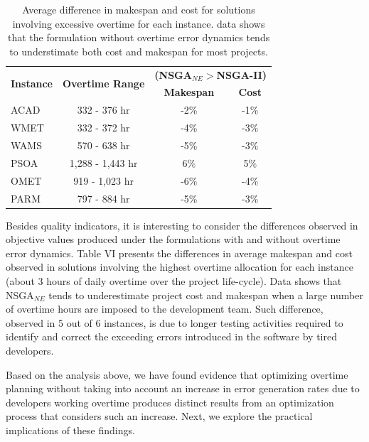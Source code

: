 \documentclass[conference]{IEEEtran}
\begin{document}
\begin{table}[htbp]
	\scriptsize
  \centering
  \caption{Average difference in makespan and cost for solutions involving excessive overtime for each instance. data shows that the formulation without overtime error dynamics tends to understimate both cost and makespan for most projects.}
    \begin{tabular}{rccc}
    \toprule
    \multicolumn{1}{c}{\multirow{2}[2]{*}{\textbf{Instance}}} & \multirow{2}[2]{*}{\textbf{Overtime  Range}} & \multicolumn{2}{c}{\textbf{(NSGA$_{NE}>$NSGA-II)}} \\

    \multicolumn{1}{c}{} &       & \textbf{Makespan } & \textbf{Cost} \\
        \midrule
    \multicolumn{1}{l}{ACAD} & 332 - 376 hr & -2\%  & -1\% \\
    \multicolumn{1}{l}{WMET} & 332 - 372 hr & -4\%  & -3\% \\
    \multicolumn{1}{l}{WAMS} & 570 - 638 hr & -5\%  & -3\% \\
    \multicolumn{1}{l}{PSOA} & 1,288 - 1,443 hr & 6\%   & 5\% \\
    \multicolumn{1}{l}{OMET} & 919 - 1,023 hr & -6\%  & -4\% \\
    \multicolumn{1}{l}{PARM} & 797 - 884 hr & -5\%  & -3\% \\
    \bottomrule
    \end{tabular}%
\end{table}%

Besides quality indicators, it is interesting to consider the differences observed in objective values produced under the formulations with and without overtime error dynamics. Table VI presents the differences in average makespan and cost observed in solutions involving the highest overtime allocation for each instance (about 3 hours of daily overtime over the project life-cycle). Data shows that NSGA$_{NE}$ tends to underestimate project cost and makespan when a large number of overtime hours are imposed to the development team. Such difference, observed in 5 out of 6 instances, is due to longer testing activities required to identify and correct the exceeding errors introduced in the software by tired developers.

Based on the analysis above, we have found evidence that optimizing overtime planning without taking into account an increase in error generation rates due to developers working overtime produces distinct results from an optimization process that considers such an increase. Next, we explore the practical implications of these findings.
\end{document}
